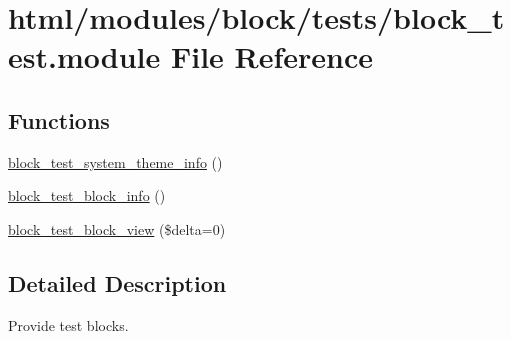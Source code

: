 \hypertarget{block__test_8module}{
\section{html/modules/block/tests/block\_\-test.module File Reference}
\label{block__test_8module}
}
\subsection*{Functions}
\begin{DoxyCompactItemize}
\item 
\hyperlink{block__test_8module_af17e7e8051b14c1ae4a7e63559d30ec2}{block\_\-test\_\-system\_\-theme\_\-info} ()
\item 
\hyperlink{block__test_8module_add8679243e7d2208ffdaf38097558dd8}{block\_\-test\_\-block\_\-info} ()
\item 
\hyperlink{block__test_8module_a2808d4c86bd2fad491f69450b2d0fcac}{block\_\-test\_\-block\_\-view} (\$delta=0)
\end{DoxyCompactItemize}


\subsection{Detailed Description}
Provide test blocks. 

